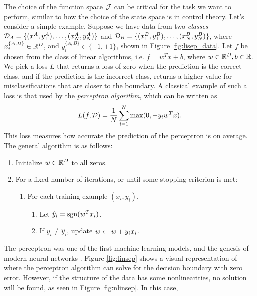 The choice of the function space $\mathcal{J}$ can be critical for the task we want to perform,
similar to how the choice of the state space is in control theory. Let's consider a simple
example. Suppose we have data from two \emph{classes} $\mathcal{D}_A = \{(x_1^A, y_1^A), \dots, (x_N^A, y_N^A)\}$ and 
$\mathcal{D}_B = \{(x_1^B, y_1^B), \dots, (x_N^B, y_N^B)\}$, where $x_i^{\{A,B\}}\in\mathbb{R}^D$, and $y_i^{\{A,B\}}\in\{-1,+1\}$, shown
in Figure \ref{fig:lisep_data}. Let $f$ be chosen from the class of linear algorithms, i.e. $f = w^Tx + b$, where $w\in\mathbb{R}^D, b\in\mathbb{R}$. 
We pick a loss $L$ that returns a loss of zero when the prediction is the correct class, and if the prediction is the incorrect class,
returns a higher value for misclassifications that are closer to the boundary. A classical example of such a loss is that used by
the \emph{perceptron algorithm}, which can be written as 
\begin{align}\eqlabel{perc_loss}
 L(f, \sampSetClass) = \frac{1}{\nsamp}\sum_{i=1}^N\max(0, -y_iw^Tx). 
\end{align}
This loss measures how accurate the prediction of the perceptron is on average. The general algorithm is as follows:
\begin{enumerate}
 \item Initialize $w\in\mathbb{R}^D$ to all zeros. 
 \item For a fixed number of iterations, or until some stopping criterion is met:
       \begin{enumerate}
        \item For each training example $(x_i, y_i)$,
              \begin{enumerate}
               \item Let $\hat{y}_i=\mathrm{sgn}(w^Tx_i)$.
               \item If $y_i\neq\hat{y}_i$, update $w \leftarrow w + y_ix_i$.
              \end{enumerate}
       \end{enumerate}
\end{enumerate}
The perceptron was one of the first machine learning models, and the genesis of modern neural networks \cite{rosenblatt1958perceptron}. 
Figure \ref{fig:linsep} shows a visual representation of where the perceptron algorithm can solve for the decision boundary with zero error. 
However, if the structure of the data has some nonlinearities, no solution will be found, as seen in Figure \ref{fig:nlinsep}. In this case,
